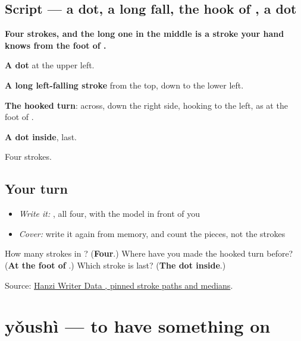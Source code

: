 \subsection*{Script — a dot, a long fall, the hook of , a dot}

\begin{quote}
\end{quote}

\textbf{Four strokes, and the long one in the middle is a stroke your hand knows from the foot of .}

\textbf{A dot} at the upper left.

\textbf{A long left-falling stroke} from the top, down to the lower left.

\textbf{The hooked turn}: across, down the right side, hooking to the left, as at the foot of .

\textbf{A dot inside}, last.

Four strokes.

\subsection*{Your turn}
\begin{itemize}
\raggedright
  \item \emph{Write it:} , all four, with the model in front of you
  \item \emph{Cover:} write it again from memory, and count the pieces, not the strokes
\end{itemize}

\begin{tcolorbox}[breakable,colback=teal!4,colframe=teal!35!black,title={Before you move on}]
How many strokes in ? (\textbf{Four}.) Where have you made the hooked turn before? (\textbf{At the foot of }.) Which stroke is last? (\textbf{The dot inside}.)

Source: \href{https://raw.githubusercontent.com/chanind/hanzi-writer-data/68d10a4b21150cae5e1ebbd223eed289cf32d90c/data/\%E4\%B8\%BA.json}{Hanzi Writer Data , pinned stroke paths and medians}.
\end{tcolorbox}
\section[yǒushì]{yǒushì — to have something on}

\label{lesson:ZH-C95-youshi}



